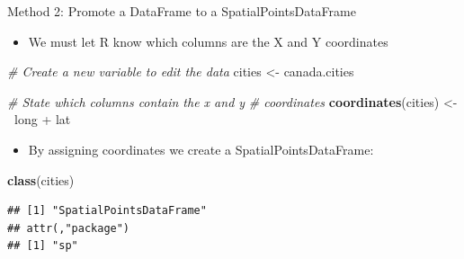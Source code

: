 \documentclass[10pt,ignorenonframetext,]{beamer}
\newenvironment{Shaded}{\begin{snugshade}}{\end{snugshade}}
\newcommand{\KeywordTok}[1]{\textcolor[rgb]{0.13,0.29,0.53}{\textbf{{#1}}}}
\newcommand{\StringTok}[1]{\textcolor[rgb]{0.31,0.60,0.02}{{#1}}}
\newcommand{\CommentTok}[1]{\textcolor[rgb]{0.56,0.35,0.01}{\textit{{#1}}}}
\newcommand{\ErrorTok}[1]{\textcolor[rgb]{0.64,0.00,0.00}{\textbf{{#1}}}}
\newcommand{\NormalTok}[1]{{#1}}
\providecommand{\tightlist}{%
  \setlength{\itemsep}{0pt}\setlength{\parskip}{0pt}}
\begin{document}
\begin{frame}[fragile]{Method 2: Promote a DataFrame to a
SpatialPointsDataFrame}

\begin{itemize}
\tightlist
\item
  We must let R know which columns are the X and Y coordinates
\end{itemize}

\begin{Shaded}
\begin{Highlighting}[]
\CommentTok{# Create a new variable to edit the data}
\NormalTok{cities <-}\StringTok{ }\NormalTok{canada.cities}

\CommentTok{# State which columns contain the x and y}
\CommentTok{# coordinates}
\KeywordTok{coordinates}\NormalTok{(cities) <-}\StringTok{ }\ErrorTok{~}\NormalTok{long +}\StringTok{ }\NormalTok{lat}
\end{Highlighting}
\end{Shaded}

\begin{itemize}
\tightlist
\item
  By assigning coordinates we create a SpatialPointsDataFrame:
\end{itemize}

\begin{Shaded}
\begin{Highlighting}[]
\KeywordTok{class}\NormalTok{(cities)}
\end{Highlighting}
\end{Shaded}

\begin{verbatim}
## [1] "SpatialPointsDataFrame"
## attr(,"package")
## [1] "sp"
\end{verbatim}

\end{frame}
\end{document}
